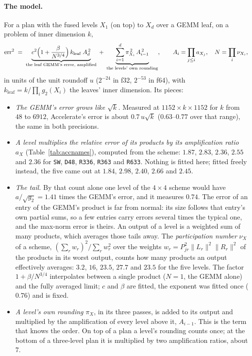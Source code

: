\documentclass[11pt]{article}
\newcommand{\lv}[1]{\texttt{#1}}
\begin{document}
\paragraph{The model.}
For a plan with the fused levels $X_1$ (on top) to $X_d$ over a GEMM leaf, on
a problem of inner dimension $k$,
\begin{equation}\label{eq:errmodel}
\text{err}^2 \;=\; \underbrace{c^2\Bigl(1+\frac{\beta}{N^{3/4}}\Bigr)\,k_{\text{leaf}}\;A_d^{\,2}}_{\text{the leaf GEMM's error, amplified}}
 \;+\; \underbrace{\sum_{i=1}^{d}\pi_{X_i}^{\,2}\,A_{i-1}^{\,2}}_{\text{the levels' own rounding}},
\qquad A_i=\prod_{j\le i}a_{X_j},\quad N=\prod_{i}\nu_{X_i},
\end{equation}
in units of the unit roundoff $u$ ($2^{-24}$ in f32, $2^{-53}$ in f64), with
$k_{\text{leaf}}=k/\prod_i g_2(X_i)$ the leaves' inner dimension.  Its pieces:
\begin{itemize}
\item \emph{The GEMM's error grows like $\sqrt{k}$.}  Measured at
  $1152\times k\times1152$ for $k$ from $48$ to $6912$, Accelerate's error is
  about $0.7\,u\sqrt{k}$ ($0.63$--$0.77$ over that range), the same in both precisions.
\item \emph{A level multiplies the relative error of its products by its
  amplification ratio} $a_X$ (Table~\ref{tab:accnames}), computed from the
  scheme: $1.87$, $2.83$, $2.36$, $2.55$ and $2.36$ for \lv{SW}, \lv{D48},
  \lv{R336}, \lv{R363} and \lv{R633}.  Nothing is fitted here; fitted freely
  instead, the five came out at $1.84$, $2.98$, $2.40$, $2.66$ and $2.45$.
\item \emph{The tail.}  By that count alone one level of the $4\times4$
  scheme would have $a/\sqrt{g_2}=1.41$ times the GEMM's error, and it
  measures $0.74$.  The error of an entry of the GEMM's product is far from
  normal: its size follows that entry's own partial sums, so a few entries
  carry errors several times the typical one, and the max-norm error is
  theirs.  An output of a level is a weighted sum of many products, which
  averages those tails away.  The \emph{participation number} $\nu_X$ of a
  scheme, $(\sum_r w_r)^2/\sum_r w_r^2$ over the weights
  $w_r=P_{jr}^2\|L_r\|^2\|R_r\|^2$ of the products in its worst output, counts
  how many products an output effectively averages: $3.2$, $16$, $23.5$,
  $27.7$ and $23.5$ for the five levels.  The factor $1+\beta/N^{3/4}$
  interpolates between a single product ($N=1$, the GEMM alone) and the fully
  averaged limit; $c$ and $\beta$ are fitted, the exponent was fitted once
  ($0.76$) and is fixed.
\item \emph{A level's own rounding} $\pi_X$, in its three passes, is added to
  its output and multiplied by the amplification of every level above it,
  $A_{i-1}$.  This is the term that knows the order.  On top of a plan a
  level's rounding counts once; at the bottom of a three-level plan it is
  multiplied by two amplification ratios, about $7$.
\end{itemize}
\end{document}
